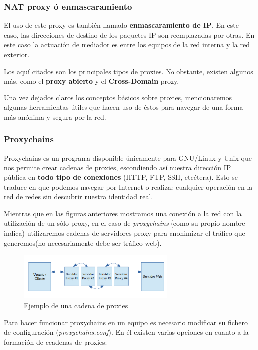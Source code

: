\subsubsection{NAT proxy ó enmascaramiento}

El uso de este proxy es también llamado \textbf{enmascaramiento de IP}. En este caso, las direcciones de destino de los paquetes IP son reemplazadas por otras. 
En este caso la actuación de mediador es entre los equipos de la red interna y la red exterior.

Los aquí citados son los principales tipos de proxies. No obstante, existen algunos más, como el \textbf{proxy abierto} y el \textbf{Cross-Domain }proxy.

Una vez dejados claros los conceptos básicos sobre proxies, mencionaremos algunas herramientas útiles que hacen uso de éstos para navegar de una forma más anónima y segura por la red.

\subsubsection{Proxychains}

Proxychains es un programa disponible únicamente para GNU/Linux y Unix que nos permite crear cadenas de proxies, escondiendo así nuestra dirección IP pública en \textbf{todo tipo de conexiones} (HTTP, FTP, SSH, etcétera). 
Esto se traduce en que podemos navegar por Internet o realizar cualquier operación en la red de redes sin descubrir nuestra identidad real.

Mientras que en las figuras anteriores mostramos una conexión a la red con la utilización de un sólo proxy, en el caso de \textit{proxychains} (como su propio nombre indica) utilizaremos cadenas de servidores proxy para anonimizar el tráfico que generemos(no necesariamente debe ser tráfico web).

\begin{figure}[h]
	\centerline{
		\mbox{\includegraphics[width=3.00in]{images/proxy_chain.png}}
	}
	\caption{Ejemplo de una cadena de proxies}
	\label{fig:norm_Daugman}
\end{figure}

Para hacer funcionar proxychains en un equipo es necesario modificar su fichero de configuración (\textit{proxychains.conf}). En él existen varias opciones en cuanto a la formación de ccadenas de proxies:

